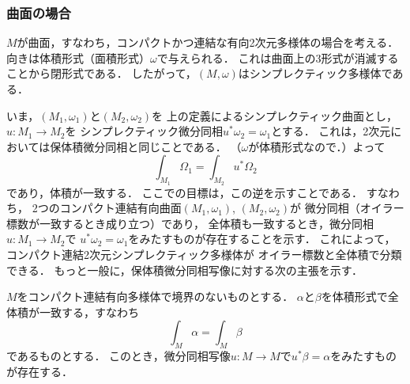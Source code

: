 \subsubsection*{曲面の場合}
\(M\)が曲面，すなわち，コンパクトかつ連結な有向2次元多様体の場合を考える．
向きは体積形式（面積形式）\(\omega\)で与えられる．
これは曲面上の\(3\)形式が消滅することから閉形式である．
したがって，\((M,\omega)\)はシンプレクティック多様体である．

いま，\((M_1,\omega_1)\)と\((M_2,\omega_2)\)を
上の定義によるシンプレクティック曲面とし，\(u\colon M_1\to M_2\)を
シンプレクティック微分同相\(u^{\ast}\omega_2=\omega_1\)とする．
これは，2次元においては保体積微分同相と同じことである．
（\(\omega\)が体積形式なので．）よって\begin{equation}
    \int_{M_1}^{}\varOmega_{1}=
    \int_{M_2}^{}u^{\ast}\varOmega_{2}
\end{equation}
であり，体積が一致する．
ここでの目標は，この逆を示すことである．
すなわち，
2つのコンパクト連結有向曲面\((M_1,\omega_1)\), \((M_2,\omega_2)\)が
微分同相（オイラー標数が一致するとき成り立つ）であり，
全体積も一致するとき，微分同相\(u\colon M_1\to M_2\)で
\(u^{\ast}\omega_2=\omega_1\)をみたすものが存在することを示す．
これによって，コンパクト連結2次元シンプレクティック多様体が
オイラー標数と全体積で分類できる．
もっと一般に，保体積微分同相写像に対する次の主張を示す．

\begin{THM}[Moser]
    \(M\)をコンパクト連結有向多様体で境界のないものとする．
    \(\alpha\)と\(\beta\)を体積形式で全体積が一致する，すなわち
    \begin{equation}
        \int_{M}^{}\alpha=
        \int_{M}^{}\beta\label{eq:1.40}
    \end{equation}
    であるものとする．
    このとき，微分同相写像\(u\colon M\to M\)で\(
        u^{\ast}\beta=\alpha
    \)をみたすものが存在する．
\end{THM}

